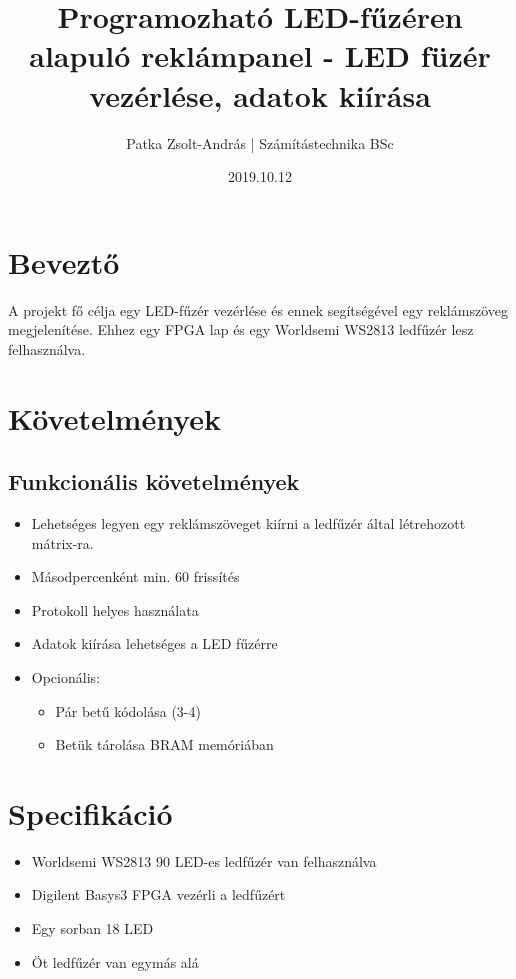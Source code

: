 \documentclass[10pt]{article} %
\title{Programozható LED-fűzéren alapuló reklámpanel - LED füzér vezérlése, adatok kiírása}
\author{Patka Zsolt-András | Számítástechnika BSc}
\date{2019.10.12}
\begin{document}
\maketitle

\section{Beveztő}

A projekt fő célja egy LED-fűzér vezérlése és ennek segítségével egy reklámszöveg megjelenítése. Ehhez egy FPGA lap és egy Worldsemi WS2813 ledfűzér lesz felhasználva.

\section{Követelmények}

\subsection{Funkcionális követelmények}
\begin{itemize}
\item Lehetséges legyen egy reklámszöveget kiírni a ledfűzér által létrehozott mátrix-ra.
\item Másodpercenként min. 60 frissítés
\end{itemize}

\begin{itemize}
\item Protokoll helyes használata
\item Adatok kiírása lehetséges a LED fűzérre
\item Opcionális: 
\begin{itemize}
	\item Pár betű kódolása (3-4)
	\item Betük tárolása BRAM memóriában
\end{itemize}	
\end{itemize}

\section{Specifikáció}

\begin{itemize}
\item Worldsemi WS2813 90 LED-es ledfűzér van felhasználva
\item Digilent Basys3 FPGA vezérli a ledfűzért 
\item Egy sorban 18 LED
\item Öt ledfűzér van egymás alá 
\end{itemize}
\end{document}
